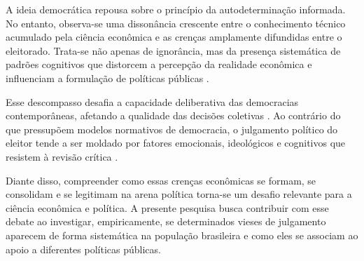 

A ideia democrática repousa sobre o princípio da autodeterminação informada. No entanto, observa-se uma dissonância crescente entre o conhecimento técnico acumulado pela ciência econômica e as crenças amplamente difundidas entre o eleitorado. Trata-se não apenas de ignorância, mas da presença sistemática de padrões cognitivos que distorcem a percepção da realidade econômica e influenciam a formulação de políticas públicas \cite{The_Myth_of_the_Rational_Voter,Judgment_under_Uncertainty}.

Esse descompasso desafia a capacidade deliberativa das democracias contemporâneas, afetando a qualidade das decisões coletivas \cite{downs1957economic}. Ao contrário do que pressupõem modelos normativos de democracia, o julgamento político do eleitor tende a ser moldado por fatores emocionais, ideológicos e cognitivos que resistem à revisão crítica \cite{kahneman2011thinking,kahan2012polarization}.

Diante disso, compreender como essas crenças econômicas se formam, se consolidam e se legitimam na arena política torna-se um desafio relevante para a ciência econômica e política. A presente pesquisa busca contribuir com esse debate ao investigar, empiricamente, se determinados vieses de julgamento aparecem de forma sistemática na população brasileira e como eles se associam ao apoio a diferentes políticas públicas.

